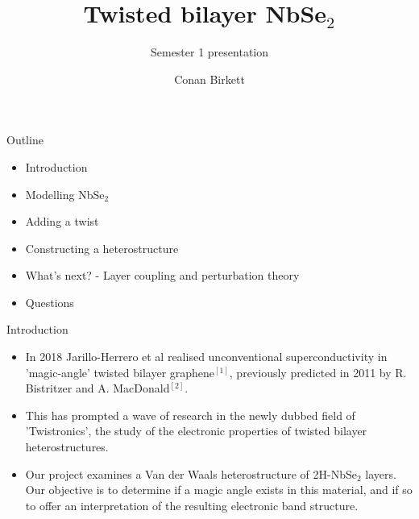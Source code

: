 \documentclass[9pt]{beamer}
\title{Twisted bilayer NbSe$_2$}
\subtitle{Semester 1 presentation}
\author{Conan Birkett}
\institute{University of Bath department of Physics}
\begin{document}
\begin{frame}
  \titlepage
\end{frame}

\begin{frame}{Outline}
  \begin{itemize}
      \item Introduction
      \item Modelling NbSe$_2$
      \item Adding a twist
      \item Constructing a heterostructure
      \item What's next? - Layer coupling and perturbation theory
      \item Questions
  \end{itemize}
\end{frame}

\begin{frame}{Introduction}
  \begin{itemize}
    \item In 2018 Jarillo-Herrero et al realised unconventional superconductivity in 'magic-angle' twisted bilayer graphene$^{[1]}$, previously predicted in 2011 by R. Bistritzer and A. MacDonald$^{[2]}$.

    \item This has prompted a wave of research in the newly dubbed field of 'Twistronics', the study of the electronic properties of twisted bilayer heterostructures.

    \item Our project examines a Van der Waals heterostructure of 2H-NbSe$_2$ layers. Our objective is to determine if a magic angle exists in this material, and if so to offer an interpretation of the resulting electronic band structure.
  \end{itemize}
\end{frame}
\end{document}
